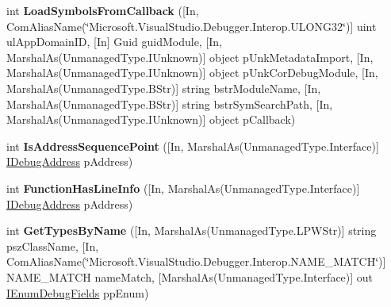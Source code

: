 \begin{DoxyCompactItemize}
\item 
\hypertarget{interface_microsoft_1_1_visual_studio_1_1_debugger_1_1_interop_e_e_1_1_i_debug_com_plus_symbol_provider2_aacc41306b9ff137fc9abb4d24e5b6fe5}{int {\bfseries Load\+Symbols\+From\+Callback} (\mbox{[}In, Com\+Alias\+Name(\char`\"{}Microsoft.\+Visual\+Studio.\+Debugger.\+Interop.\+U\+L\+O\+N\+G32\char`\"{})\mbox{]} uint ul\+App\+Domain\+I\+D, \mbox{[}In\mbox{]} Guid guid\+Module, \mbox{[}In, Marshal\+As(Unmanaged\+Type.\+I\+Unknown)\mbox{]} object p\+Unk\+Metadata\+Import, \mbox{[}In, Marshal\+As(Unmanaged\+Type.\+I\+Unknown)\mbox{]} object p\+Unk\+Cor\+Debug\+Module, \mbox{[}In, Marshal\+As(Unmanaged\+Type.\+B\+Str)\mbox{]} string bstr\+Module\+Name, \mbox{[}In, Marshal\+As(Unmanaged\+Type.\+B\+Str)\mbox{]} string bstr\+Sym\+Search\+Path, \mbox{[}In, Marshal\+As(Unmanaged\+Type.\+I\+Unknown)\mbox{]} object p\+Callback)}\label{interface_microsoft_1_1_visual_studio_1_1_debugger_1_1_interop_e_e_1_1_i_debug_com_plus_symbol_provider2_aacc41306b9ff137fc9abb4d24e5b6fe5}

\item 
\hypertarget{interface_microsoft_1_1_visual_studio_1_1_debugger_1_1_interop_e_e_1_1_i_debug_com_plus_symbol_provider2_a6564f9d10846511d0145bcbc2e4337c9}{int {\bfseries Is\+Address\+Sequence\+Point} (\mbox{[}In, Marshal\+As(Unmanaged\+Type.\+Interface)\mbox{]} \hyperlink{interface_microsoft_1_1_visual_studio_1_1_debugger_1_1_interop_e_e_1_1_i_debug_address}{I\+Debug\+Address} p\+Address)}\label{interface_microsoft_1_1_visual_studio_1_1_debugger_1_1_interop_e_e_1_1_i_debug_com_plus_symbol_provider2_a6564f9d10846511d0145bcbc2e4337c9}

\item 
\hypertarget{interface_microsoft_1_1_visual_studio_1_1_debugger_1_1_interop_e_e_1_1_i_debug_com_plus_symbol_provider2_a4a7127075053eb6287330551eb935651}{int {\bfseries Function\+Has\+Line\+Info} (\mbox{[}In, Marshal\+As(Unmanaged\+Type.\+Interface)\mbox{]} \hyperlink{interface_microsoft_1_1_visual_studio_1_1_debugger_1_1_interop_e_e_1_1_i_debug_address}{I\+Debug\+Address} p\+Address)}\label{interface_microsoft_1_1_visual_studio_1_1_debugger_1_1_interop_e_e_1_1_i_debug_com_plus_symbol_provider2_a4a7127075053eb6287330551eb935651}

\item 
\hypertarget{interface_microsoft_1_1_visual_studio_1_1_debugger_1_1_interop_e_e_1_1_i_debug_com_plus_symbol_provider2_ab48f8bc9059e1da1cefa08afd2f813ac}{int {\bfseries Get\+Types\+By\+Name} (\mbox{[}In, Marshal\+As(Unmanaged\+Type.\+L\+P\+W\+Str)\mbox{]} string psz\+Class\+Name, \mbox{[}In, Com\+Alias\+Name(\char`\"{}Microsoft.\+Visual\+Studio.\+Debugger.\+Interop.\+N\+A\+M\+E\+\_\+\+M\+A\+T\+C\+H\char`\"{})\mbox{]} N\+A\+M\+E\+\_\+\+M\+A\+T\+C\+H name\+Match, \mbox{[}Marshal\+As(Unmanaged\+Type.\+Interface)\mbox{]} out \hyperlink{interface_microsoft_1_1_visual_studio_1_1_debugger_1_1_interop_e_e_1_1_i_enum_debug_fields}{I\+Enum\+Debug\+Fields} pp\+Enum)}\label{interface_microsoft_1_1_visual_studio_1_1_debugger_1_1_interop_e_e_1_1_i_debug_com_plus_symbol_provider2_ab48f8bc9059e1da1cefa08afd2f813ac}


\end{DoxyCompactItemize}

